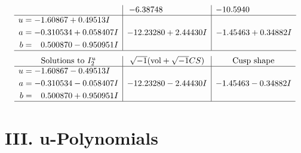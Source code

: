 \documentclass[1p]{elsarticle_modified}
\theoremstyle{definition}
\newcommand{\I}{\sqrt{-1}}
\begin{document}
$$\begin{array}{c|c|c}
 & -6.38748\phantom{ +0.000000I} & -10.5940\phantom{ +0.000000I} \\ \hline\begin{aligned}
u &= -1.60867 + 0.49513 I \\
a &= -0.310534 + 0.058407 I \\
b &= \phantom{-}0.500870 - 0.950951 I\end{aligned}
 & -12.23280 + 2.44430 I & -1.45463 + 0.34882 I\\
 \hline 
 \end{array}$$\newpage$$\begin{array}{c|c|c}  
\text{Solutions to }I^u_{2}& \I (\text{vol} + \sqrt{-1}CS) & \text{Cusp shape}\\
 \hline 
\begin{aligned}
u &= -1.60867 - 0.49513 I \\
a &= -0.310534 - 0.058407 I \\
b &= \phantom{-}0.500870 + 0.950951 I\end{aligned}
 & -12.23280 - 2.44430 I & -1.45463 - 0.34882 I\\
 \hline 
 \end{array}$$\newpage
\newpage\renewcommand{\arraystretch}{1}
\centering \section*{ III. u-Polynomials}
\end{document}
